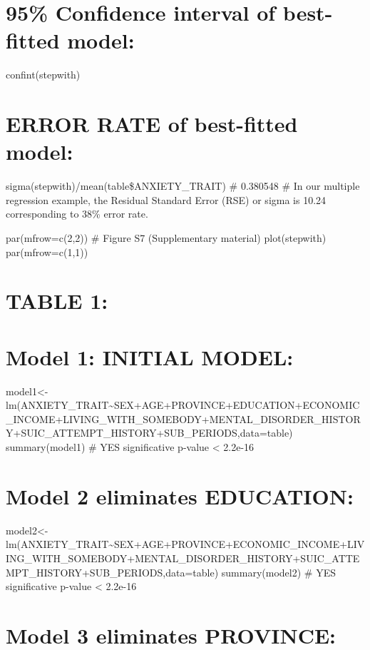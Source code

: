 \documentclass[
]{book}
\begin{document}
\hypertarget{confidence-interval-of-best-fitted-model-2}{%
\chapter{95\% Confidence interval of best-fitted model:}\label{confidence-interval-of-best-fitted-model-2}}

confint(stepwith)

\hypertarget{error-rate-of-best-fitted-model-2}{%
\chapter{ERROR RATE of best-fitted model:}\label{error-rate-of-best-fitted-model-2}}

sigma(stepwith)/mean(table\$ANXIETY\_TRAIT)
\# 0.380548
\# In our multiple regression example, the Residual Standard Error (RSE) or sigma is 10.24 corresponding to 38\% error rate.

par(mfrow=c(2,2))
\# Figure S7 (Supplementary material)
plot(stepwith)
par(mfrow=c(1,1))

\hypertarget{table-1-2}{%
\chapter{TABLE 1:}\label{table-1-2}}

\hypertarget{model-1-initial-model-2}{%
\chapter{Model 1: INITIAL MODEL:}\label{model-1-initial-model-2}}

model1\textless-lm(ANXIETY\_TRAIT\textasciitilde SEX+AGE+PROVINCE+EDUCATION+ECONOMIC\_INCOME+LIVING\_WITH\_SOMEBODY+MENTAL\_DISORDER\_HISTORY+SUIC\_ATTEMPT\_HISTORY+SUB\_PERIODS,data=table)
summary(model1)
\# YES significative p-value \textless{} 2.2e-16

\hypertarget{model-2-eliminates-education}{%
\chapter{Model 2 eliminates EDUCATION:}\label{model-2-eliminates-education}}

model2\textless-lm(ANXIETY\_TRAIT\textasciitilde SEX+AGE+PROVINCE+ECONOMIC\_INCOME+LIVING\_WITH\_SOMEBODY+MENTAL\_DISORDER\_HISTORY+SUIC\_ATTEMPT\_HISTORY+SUB\_PERIODS,data=table)
summary(model2)
\# YES significative p-value \textless{} 2.2e-16

\hypertarget{model-3-eliminates-province}{%
\chapter{Model 3 eliminates PROVINCE:}\label{model-3-eliminates-province}}
\end{document}
